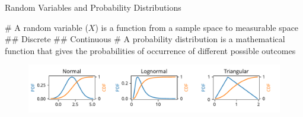 \documentclass[12pt, aspectratio=149]{beamer}
\theoremstyle{plain}
\begin{document}
\begin{frame}[fragile]{Random Variables and Probability Distributions}

	\begin{easylist}[itemize]
		# A random variable ($X$) is a function from a sample space to measurable space 
		## Discrete
		## Continuous
		# A probability distribution is a mathematical function that gives the probabilities of occurrence of different possible outcomes
	\end{easylist}

	\begin{figure}
		\centering
		\includegraphics[width=0.99\linewidth]{figures/pdfs_cdfs}
	\end{figure}

\end{frame}
\end{document}
